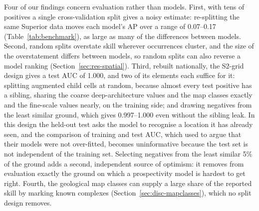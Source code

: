 \documentclass[pdflatex,sn-apa]{sn-jnl}
\begin{document}
Four of our findings concern evaluation rather than models. First, with tens of positives a single cross-validation split gives a noisy estimate: re-splitting the same Superior data moves each model's AP over a range of 0.07--0.17 (Table~\ref{tab:benchmark}), as large as many of the differences between models. Second, random splits overstate skill wherever occurrences cluster, and the size of the overstatement differs between models, so random splits can also reverse a model ranking (Section~\ref{sec:res-spatial}). Third, rebuilt nationally, the S2-grid design gives a test AUC of 1.000, and two of its elements each suffice for it: splitting augmented child cells at random, because almost every test positive has a sibling, sharing the coarse deep-architecture values and the map classes exactly and the fine-scale values nearly, on the training side; and drawing negatives from the least similar ground, which gives 0.997--1.000 even without the sibling leak. In this design the held-out test asks the model to recognise a location it has already seen, and the comparison of training and test AUC, which \citet{Parsa2024} used to argue that their models were not over-fitted, becomes uninformative because the test set is not independent of the training set. Selecting negatives from the least similar 5\% of the ground adds a second, independent source of optimism: it removes from evaluation exactly the ground on which a prospectivity model is hardest to get right. Fourth, the geological map classes can supply a large share of the reported skill by marking known complexes (Section~\ref{sec:disc-mapclasses}), which no split design removes.
\end{document}
